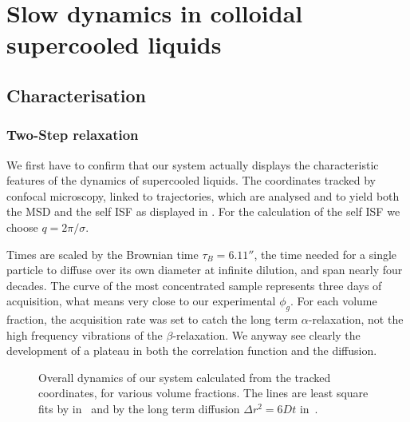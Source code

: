 \chapter{Slow dynamics in colloidal supercooled liquids}
\label{ch:results_dynamics}

\section{Characterisation}
\label{sec:characterise_dyn}

\subsection{Two-Step relaxation}
\label{sec:result_2step}

We first have to confirm that our system actually displays the characteristic features of the dynamics of supercooled liquids. The coordinates tracked by confocal microscopy, linked to trajectories, which are analysed   and  to yield both the \ac{MSD} and the self \ac{ISF} as displayed in . For the calculation of the self \ac{ISF} we choose $q=2\pi/\sigma$. 

Times are scaled by the Brownian time $\tau_B=\unit{6.11}{\second}$,  the time needed for a single particle to diffuse over its own diameter at infinite dilution, and span nearly four decades. The curve of the most concentrated sample represents three days of acquisition, what means very close to our experimental $\phi_g$. For each volume fraction, the acquisition rate was set to catch the long term $\alpha$-relaxation, not the high frequency vibrations of the $\beta$-relaxation. We anyway see clearly the development of a plateau in both the correlation function and the diffusion.

\begin{figure}
	\centering
	\subfloat[\ac{MSD}]{\label{fig:msd}\resizebox{0.5\textwidth}{!}{\begin{Large}\end{Large}}}
	\caption{Overall dynamics of our system calculated from the tracked coordinates, for various volume fractions. The lines are least square fits by  in~ and by the long term diffusion $\Delta r^2 = 6 D t$ in~.}
	\label{fig:isf_msd}
\end{figure}

